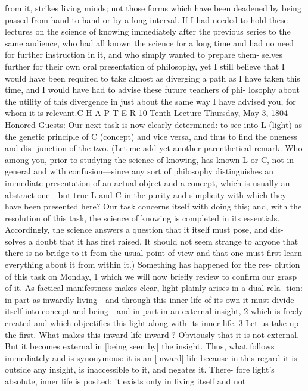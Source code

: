 from it, strikes living minds; not those forms which have been deadened by
being passed from hand to hand or by a long interval. If I had needed to hold
these lectures on the science of knowing immediately after the previous series
to the same audience, who had all known the science for a long time and had
no need for further instruction in it, and who simply wanted to prepare them-
selves further for their own oral presentation of philosophy, yet I still believe
that I would have been required to take almost as diverging a path as I have
taken this time, and I would have had to advise these future teachers of phi-
losophy about the utility of this divergence in just about the same way I have
advised you, for whom it is relevant.C H A P T E R
10
Tenth Lecture
Thursday, May 3, 1804
Honored Guests:
Our next task is now clearly determined: to see into L (light) as the genetic
principle of C (concept) and vice versa, and thus to find the oneness and dis-
junction of the two. (Let me add yet another parenthetical remark. Who
among you, prior to studying the science of knowing, has known L or C, not
in general and with confusion—since any sort of philosophy distinguishes an
immediate presentation of an actual object and a concept, which is usually an
abstract one—but true L and C in the purity and simplicity with which they
have been presented here? Our task concerns itself with doing this; and, with
the resolution of this task, the science of knowing is completed in its essentials.
Accordingly, the science answers a question that it itself must pose, and dis-
solves a doubt that it has first raised. It should not seem strange to anyone that
there is no bridge to it from the usual point of view and that one must first
learn everything about it from within it.) Something has happened for the res-
olution of this task on Monday, 1 which we will now briefly review to confirm
our grasp of it.
As factical manifestness makes clear, light plainly arises in a dual rela-
tion: in part as inwardly living—and through this inner life of its own it must
divide itself into concept and being—and in part in an external insight, 2 which
is freely created and which objectifies this light along with its inner life. 3 Let
us take up the first. What makes this inward life inward ? Obviously that it is
not external. But it becomes external in [being seen by] the insight. Thus,
what follows immediately and is synonymous: it is an [inward] life because in
this regard it is outside any insight, is inaccessible to it, and negates it. There-
fore light’s absolute, inner life is posited; it exists only in living itself and not
